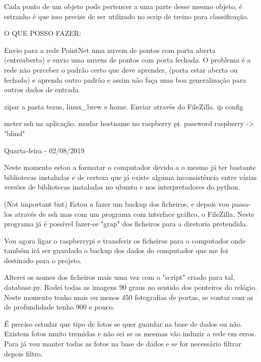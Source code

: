             
        Cada ponto de um objeto pode pertencer a uma parte desse mesmo objeto, é estranho é que isso precise de ser utilizado no scrip de treino para classificação.
            
        O QUE POSSO FAZER:
        
        Envio para a rede PointNet uma nuvem de pontos com porta aberta (entreaberta) e envio uma nuvem de pontos com porta fechada. O problema é a rede não perceber o padrão certo que deve aprender, (porta estar aberta ou fechada) e aprenda outro padrão e assim não faça uma boa generalização para outros dados de entrada.
        
        zipar a pasta tezus, linux\_brew e home. Enviar através do FileZilla.
        ip config
        
        meter ssh na aplicação.
        mudar hostname no raspberry pi.
        password raspberry -> "blind"
        
        
        
        \bigskip
        
        Quarta-feira - 02/08/2019
        
        Neste momento estou a formatar o computador devido a o mesmo já ter bastante bibliotecas instaladas e de certeza que já existe alguma inconsistência entre várias versões de bibliotecas instaladas no ubuntu e nos interpretadores do python.
        
        (Not important but) Estou a fazer um backup dos ficheiros, e depois vou passa-los através de ssh mas com um programa com interface gráfico, o FileZilla. Neste programa já é possível fazer-se "grap" dos ficheiros para a diretoria pretendida.
        
        Vou agora ligar o raspberrypi e transferir os ficheiros para o computador onde também irá ser guardado o backup dos dados do computador que me foi destinado para o projeto. 
        
        Alterei os nomes dos ficheiros mais uma vez com o "script" criado para tal, database.py. Rodei todas as imagens 90 graus no sentido dos ponteiros do relógio.
        Neste momento tenho mais ou menos 450 fotografias de portas, se contar com as de profundidade tenho 900 e pouco.
        
        É preciso estudar que tipo de fotos se quer guardar na base de dados ou não. Existem fotos muito tremidas e não sei se as mesmas vão induzir a rede em erros. Para já vou manter todas as fotos na base de dados e se for necessário filtrar depois filtro.
        

